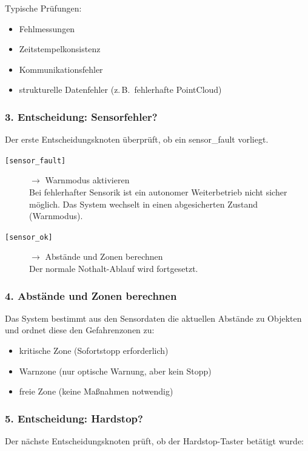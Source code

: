 \quad Typische Prüfungen:
\begin{itemize}
    \item Fehlmessungen
    \item Zeitstempelkonsistenz
    \item Kommunikationsfehler
    \item strukturelle Datenfehler (z.\,B.\ fehlerhafte PointCloud)
\end{itemize}

\subsubsection*{3. Entscheidung: Sensorfehler?}

\quad Der erste Entscheidungsknoten überprüft, ob ein sensor\_fault vorliegt.

\begin{description}
    \item[\texttt{[sensor\_fault]}] $\rightarrow$ Warnmodus aktivieren\\
    \quad Bei fehlerhafter Sensorik ist ein autonomer Weiterbetrieb nicht sicher möglich. Das System wechselt in einen abgesicherten Zustand (Warnmodus).
    \item[\texttt{[sensor\_ok]}] $\rightarrow$ Abstände und Zonen berechnen\\
    \quad Der normale Nothalt-Ablauf wird fortgesetzt.
\end{description}

\subsubsection*{4. Abstände und Zonen berechnen}

\quad Das System bestimmt aus den Sensordaten die aktuellen Abstände zu Objekten und ordnet diese den Gefahrenzonen zu:
\begin{itemize}
    \item kritische Zone (Sofortstopp erforderlich)
    \item Warnzone (nur optische Warnung, aber kein Stopp)
    \item freie Zone (keine Maßnahmen notwendig)
\end{itemize}

\subsubsection*{5. Entscheidung: \ac{Hardstop}?}

\quad Der nächste Entscheidungsknoten prüft, ob der Hardstop-Taster betätigt wurde:

